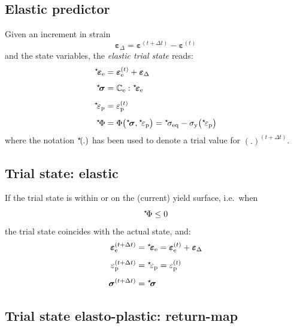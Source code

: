 \documentclass[times,namecite]{goose-article}
\newcommand\leftstar[1]{\hspace*{-.3em}~^\star\!#1}
\begin{document}
\subsection{Elastic predictor}

Given an increment in strain
\begin{equation}
  \bm{\varepsilon}_\Delta = \bm{\varepsilon}^{(t + \Delta t)} - \bm{\varepsilon}^{(t)}
  \label{eq:strain-increment}
\end{equation}
and the state variables, the \emph{elastic trial state} reads:
\begin{align}
  \leftstar{\bm{\varepsilon}}_\mathrm{e}
  &=
  \bm{\varepsilon}^{(t)}_\mathrm{e} + \bm{\varepsilon}_\Delta \label{eq:trial-strain}
  \\[1ex]
  \leftstar{\bm{\sigma}}
  &=
  \mathbb{C}_\mathrm{e} : \leftstar{\bm{\varepsilon}}_\mathrm{e}
  \\[1ex]
  \leftstar{\varepsilon}_\mathrm{p}
  &=
  \varepsilon_\mathrm{p}^{(t)}
  \\[1ex]
  \leftstar{\Phi}
  &= \Phi \big( \leftstar{\bm{\sigma}} , \leftstar{\varepsilon}_\mathrm{p} \big)
   = \leftstar{\sigma}_\mathrm{eq} - \sigma_\mathrm{y} \big( \leftstar{\varepsilon}_\mathrm{p} \big)
\end{align}
where the notation $\leftstar{(.)}$ has been used to denote a trial value for $(.)^{(t + \Delta t)}$.

\subsection{Trial state: elastic}

If the trial state is within or on the (current) yield surface, i.e.\ when
\begin{equation}
  \leftstar{\Phi} \leq 0
\end{equation}
the trial state coincides with the actual state, and:
\begin{align}
  \bm{\varepsilon}_\mathrm{e}^{(t+\Delta t)}
  &= \leftstar{\bm{\varepsilon}}_\mathrm{e}
   = \bm{\varepsilon}_\mathrm{e}^{(t)} + \bm{\varepsilon}_\Delta
  \\[1ex]
  \varepsilon_\mathrm{p}^{(t+\Delta t)}
  &= \leftstar{\varepsilon}_\mathrm{p}
   = \varepsilon_\mathrm{p}^{(t)}
  \\[1ex]
  \bm{\sigma}^{(t+\Delta t)}
  &= \leftstar{\bm{\sigma}}
\end{align}

\subsection{Trial state elasto-plastic: return-map}
\end{document}

